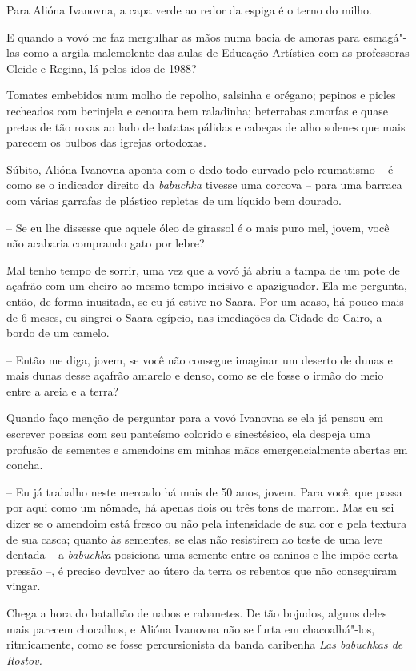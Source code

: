 Para Alióna Ivanovna, a capa verde ao redor da espiga é o terno do
milho.

E quando a vovó me faz mergulhar as mãos numa bacia de amoras para
esmagá"-las como a argila malemolente das aulas de Educação Artística com
as professoras Cleide e Regina, lá pelos idos de 1988?

Tomates embebidos num molho de repolho, salsinha e orégano; pepinos e
picles recheados com berinjela e cenoura bem raladinha; beterrabas
amorfas e quase pretas de tão roxas ao lado de batatas pálidas e cabeças
de alho solenes que mais parecem os bulbos das igrejas ortodoxas.

Súbito, Alióna Ivanovna aponta com o dedo todo curvado pelo reumatismo
-- é como se o indicador direito da \emph{babuchka} tivesse uma corcova
-- para uma barraca com várias garrafas de plástico repletas de um
líquido bem dourado.

-- Se eu lhe dissesse que aquele óleo de girassol é o mais puro mel,
jovem, você não acabaria comprando gato por lebre?

Mal tenho tempo de sorrir, uma vez que a vovó já abriu a tampa de um
pote de açafrão com um cheiro ao mesmo tempo incisivo e apaziguador. Ela
me pergunta, então, de forma inusitada, se eu já estive no Saara. Por um
acaso, há pouco mais de 6 meses, eu singrei o Saara egípcio, nas
imediações da Cidade do Cairo, a bordo de um camelo.

-- Então me diga, jovem, se você não consegue imaginar um deserto de
dunas e mais dunas desse açafrão amarelo e denso, como se ele fosse o
irmão do meio entre a areia e a terra?

Quando faço menção de perguntar para a vovó Ivanovna se ela já %
pensou em escrever poesias com seu panteísmo colorido e sinestésico, ela
despeja uma profusão de sementes e amendoins em minhas mãos
emergencialmente abertas em concha.

-- Eu já trabalho neste mercado há mais de 50 anos, jovem. Para você,
que passa por aqui como um nômade, há apenas dois ou três tons de
marrom. Mas eu sei dizer se o amendoim está fresco ou não pela
intensidade de sua cor e pela textura de sua casca; quanto às sementes,
se elas não resistirem ao teste de uma leve dentada -- a \emph{babuchka}
posiciona uma semente entre os caninos e lhe impõe certa pressão --, é
preciso devolver ao útero da terra os rebentos que não conseguiram
vingar.

Chega a hora do batalhão de nabos e rabanetes. De tão bojudos, alguns
deles mais parecem chocalhos, e Alióna Ivanovna não se furta em
chacoalhá"-los, ritmicamente, como se fosse percursionista da banda
caribenha \emph{Las babuchkas de Rostov. }

